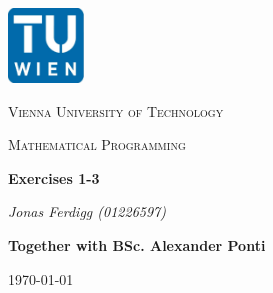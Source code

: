 
\begin{titlepage}
	\centering
	\includegraphics[width=0.15\textwidth]{./img/logo_tuwien.png}\par\vspace{1cm}
	{\scshape\LARGE Vienna University of Technology \par}
	\vspace{1cm}
	{\scshape\Large Mathematical Programming \par}
	\vspace{1.5cm}
	{\huge\bfseries Exercises 1-3   \par}
	\vspace{2cm}
	{\Large\itshape Jonas Ferdigg (01226597) \par}
	\vfill
	{\Large \bfseries{Together with BSc. Alexander Ponti} \par}
	\vspace*{1ex}
	{\large \today\par}
\end{titlepage}

